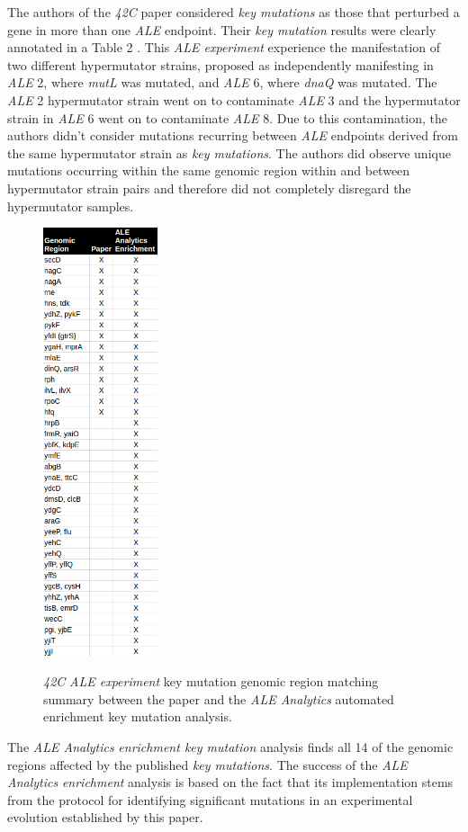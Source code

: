 \documentclass[12pt,final,masters,chapterheads]{ucsd}  %
\begin{document}
The authors of the \textit{42C} paper considered \textit{key mutations} as those that perturbed a gene in more than one \textit{ALE} endpoint. Their \textit{key mutation} results were clearly annotated in a Table 2 \cite{pmid25015645}. This \textit{ALE experiment} experience the manifestation of two different hypermutator strains, proposed as independently manifesting in \textit{ALE} 2, where \textit{mutL} was mutated, and \textit{ALE} 6, where \textit{dnaQ} was mutated. The \textit{ALE} 2 hypermutator strain went on to contaminate \textit{ALE} 3 and the hypermutator strain in \textit{ALE} 6 went on to contaminate \textit{ALE} 8. Due to this contamination, the authors didn't consider mutations recurring between \textit{ALE} endpoints derived from the same hypermutator strain as \textit{key mutations}. The authors did observe unique mutations occurring within the same genomic region within and between hypermutator strain pairs and therefore did not completely disregard the hypermutator samples.
\begin{figure}[H]
  \caption{\textit{42C} \textit{ALE experiment} {key mutation} genomic region matching summary between the paper and the \textit{ALE Analytics} automated {enrichment key mutation} analysis.}
  \centering
  \includegraphics[width=0.3\textwidth]{42c_key_mutation_regions.png}
  \label{fig:42c_key_mutation_regions}
\end{figure}
The \textit{ALE Analytics} \textit{enrichment key mutation} analysis finds all 14 of the genomic regions affected by the published \textit{key mutations}. The success of the \textit{ALE Analytics} \textit{enrichment} analysis is based on the fact that its implementation stems from the protocol for identifying significant mutations in an experimental evolution established by this paper.
\end{document}
